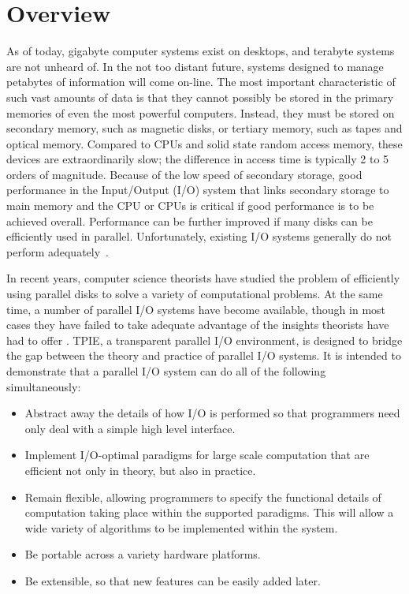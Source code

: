 \chapter{Overview}

As of today, gigabyte computer systems exist on desktops, and terabyte
systems are not unheard of.  In the not too distant future, systems
designed to manage petabytes of information
will come on-line.  The most important characteristic of such vast
amounts of data is that they cannot possibly be stored in the primary
memories of even the most powerful computers.  Instead, they must be
stored on secondary memory, such as magnetic disks, or tertiary
memory, such as tapes and optical memory.  Compared to CPUs and solid
state random access memory, these devices are extraordinarily slow;
the difference in access time is typically 2 to 5 orders of magnitude.
Because of the low speed of secondary storage, good performance in the
Input/Output (I/O) system that links secondary storage to main memory
and the CPU or CPUs is critical if good performance is to be achieved
overall.  Performance can be further improved if many disks can be
efficiently used in parallel.  Unfortunately, existing I/O systems
generally do not perform adequately~\cite{patt:computer}.

In recent years, computer science theorists have studied the problem
of efficiently using parallel disks
 to solve a variety
of computational problems.  At the same time, a number of parallel I/O
systems have become available, though in most cases they have failed
to take adequate advantage of the insights theorists have had to offer
\cite{cormen:integrate-tr}.  TPIE, a transparent parallel I/O
environment, is designed to bridge the gap between the theory and
practice of parallel I/O systems.  It is intended to demonstrate that
a parallel I/O system can do all of the following simultaneously:
\begin{itemize}
\item Abstract away the details of how I/O is performed so that
  programmers need only deal with a simple high level interface.
\item Implement I/O-optimal paradigms for large scale computation that
  are efficient not only in theory, but also in practice.
\item Remain flexible, allowing programmers to specify the functional
  details of computation taking place within the supported paradigms.
  This will allow a wide variety of algorithms to be implemented
  within the system.
\item Be portable across a variety hardware platforms.
\item Be extensible, so that new features can be easily added later.
\end{itemize}

